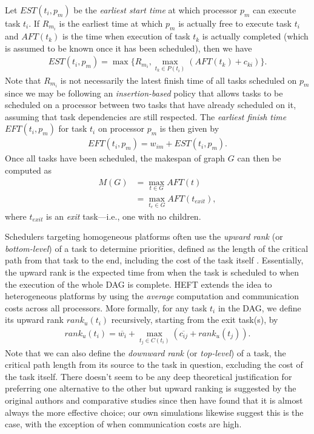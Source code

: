 \documentclass[runningheads]{llncs}
\begin{document}
Let $EST(t_i, p_m)$ be the {\em earliest start time} at which processor $p_m$ can execute task $t_i$. If $R_{m_i}$ is the earliest time at which $p_m$ is actually free to execute task $t_i$ and $AFT(t_k)$ is the time when execution of task $t_k$ is actually completed (which is assumed to be known once it has been scheduled), then we have 
\begin{align*}
EST(t_i, p_m) = \max \bigg\{ R_{m_i}, \max_{t_k \in P(t_i)} (AFT(t_k) + c_{ki}) \bigg\}.
\end{align*}
Note that $R_{m_i}$ is not necessarily the latest finish time of all tasks scheduled on $p_m$ since we may be following an {\em insertion-based} policy that allows tasks to be scheduled on a processor between two tasks that have already scheduled on it, assuming that task dependencies are still respected. The {\em earliest finish time} $EFT(t_i, p_m)$ for task $t_i$ on processor $p_m$ is then given by 
\begin{align*}
EFT(t_i, p_m) = w_{im} + EST(t_i, p_m).
\end{align*}
Once all tasks have been scheduled, the makespan of graph $G$ can then be computed as 
\begin{align*}
M(G) &= \max_{t \in G} AFT(t) \\
&= \max_{t_e \in G} AFT(t_{exit}),
\end{align*}
where $t_{exit}$ is an {\em exit} task---i.e., one with no children. 

Schedulers targeting homogeneous platforms often use the {\em upward rank} (or {\em bottom-level}) of a task to determine priorities, defined as the length of the critical path from that task to the end, including the cost of the task itself \cite{topcuoglu2002performance}. Essentially, the upward rank is the expected time from when the task is scheduled to when the execution of the whole DAG is complete. HEFT extends the idea to heterogeneous platforms by using the {\em average} computation and communication costs across all processors. More formally, for any task $t_i$ in the DAG, we define its upward rank $rank_u(t_i)$ recursively, starting from the exit task(s), by
\begin{align}
\label{eq.upward_rank}
rank_u(t_i) = \overline{w_i} + \max_{t_j \in C(t_i)} (\overline{c_{ij}} + rank_u(t_j)).
\end{align}
Note that we can also define the {\em downward rank} (or {\em top-level}) of a task, the critical path length from its source to the task in question, excluding the cost of the task itself. There doesn't seem to be any deep theoretical justification for preferring one alternative to the other but upward ranking is suggested by the original authors and comparative studies since then have found that it is almost always the more effective choice; our own simulations likewise suggest this is the case, with the exception of when communication costs are high. 
\end{document}
